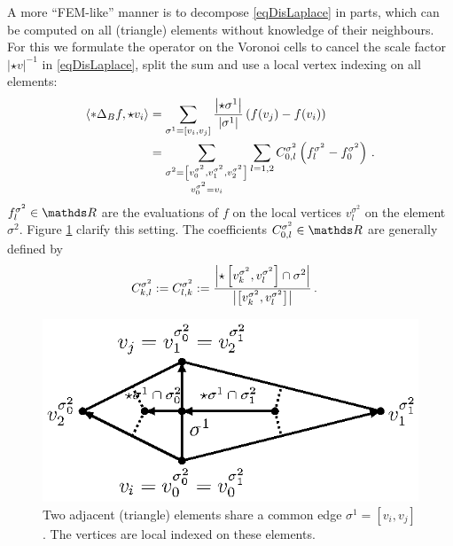         A more ``FEM-like'' manner is to decompose \eqref{eqDisLaplace} in parts, which can be computed on all (triangle) elements without
        knowledge of their neighbours.
        For this we formulate the operator on the Voronoi cells to cancel the scale factor \( \left| \star v \right|^{-1} \) 
        in \eqref{eqDisLaplace}, split the sum and use a local vertex indexing on all elements:
        \begin{align} \label{eqVoronoiLaplace}
                \left\langle *\Delta_{B} f , \star v_{i} \right\rangle
                               &= \sum_{\sigma^{1}=\left[ v_{i}, v_{j} \right]} 
                     \frac{\left| \star\sigma^{1} \right|}{\left| \sigma^{1} \right|}
                      \left( f(v_{j}) - f(v_{i}) \right)\\
                               &= \sum_{\substack{\sigma^{2}=\left[ v^{\sigma^{2}}_{0},v^{\sigma^{2}}_{1},v^{\sigma^{2}}_{2} \right]
                              \\
                                               v^{\sigma^{2}}_{0} = v_{i}}}
                  \sum_{l=1,2} C^{\sigma^{2}}_{0,l} 
                          \left( f^{\sigma^{2}}_{l} -  f^{\sigma^{2}}_{0}\right) \,\text{.} \label{eqLokalLaplace}
        \end{align}
        \( f^{\sigma^{2}}_{l}\in\R \) are the evaluations of \( f \) on the local vertices \( v^{\sigma^{2}}_{l} \) on the element \(
        \sigma^{2}\).
        Figure \ref{figLocalIndexing} clarify this setting.
        The coefficients \( C^{\sigma^{2}}_{0,l}\in\R \) are generally defined by
        \begin{align}
               C^{\sigma^{2}}_{k,l} &:= C^{\sigma^{2}}_{l,k}
                            := \frac{\left| \star \left[ v^{\sigma^{2}}_{k}, v^{\sigma^{2}}_{l} \right] 
                                            \cap \sigma^{2}\right|}
                                   {\left| \left[ v^{\sigma^{2}}_{k}, v^{\sigma^{2}}_{l} \right] \right|}\,\text{.}
        \end{align}
        \begin{figure}
          \centering
          \includegraphics[width=.45\textwidth]{bilder/tikz/elementSummeKante.eps}
          \caption{Two adjacent (triangle) elements share a common edge \( \sigma^{1}=\left[ v_{i}, v_{j} \right] \).
                   The vertices are local indexed on these elements.}
          \label{figLocalIndexing}
        \end{figure}
